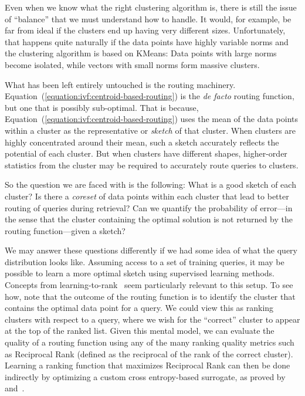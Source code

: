 Even when we know what the right clustering algorithm is, there is still
the issue of ``balance'' that we must understand how to handle. It would,
for example, be far from ideal if the clusters end up having very different
sizes. Unfortunately, that happens quite naturally if the data points have
highly variable norms and the clustering algorithm is based on KMeans:
Data points with large norms become isolated, while vectors with small
norms form massive clusters.

\bigskip

What has been left entirely untouched is the routing machinery.
Equation~(\ref{equation:ivf:centroid-based-routing}) is the \emph{de facto}
routing function, but one that is possibly sub-optimal.
That is because, Equation~(\ref{equation:ivf:centroid-based-routing})
uses the mean of the data points within a cluster as the representative
or \emph{sketch} of that cluster. When clusters are highly concentrated
around their mean, such a sketch accurately reflects the potential of each
cluster. But when clusters have different shapes, higher-order statistics
from the cluster may be required to accurately route queries to clusters.

So the question we are faced with is the following: What is a good sketch
of each cluster? Is there a \emph{coreset} of data points within each cluster
that lead to better routing of queries during retrieval? Can we quantify the
probability of error---in the sense that the cluster containing the optimal
solution is not returned by the routing function---given a sketch?

We may answer these questions differently if we had some idea of what the query
distribution looks like. Assuming access to a set of training queries, it may
be possible to learn a more optimal sketch using supervised learning methods.
Concepts from learning-to-rank~\citep{bruch2023fntir}
seem particularly relevant to this setup. To see how, note that the
outcome of the routing function is to
identify the cluster that contains the optimal data point for a query.
We could view this as ranking clusters with respect to a query,
where we wish for the ``correct'' cluster to appear at the top
of the ranked list. Given this mental model, we
can evaluate the quality of a routing function using any of the many
ranking quality metrics such as Reciprocal Rank (defined as the reciprocal
of the rank of the correct cluster).
Learning a ranking function that maximizes Reciprocal Rank
can then be done indirectly by optimizing a custom
cross entropy-based surrogate, as proved by~\cite{bruch2019xendcg} and~\cite{bruch2021xendcg}.

